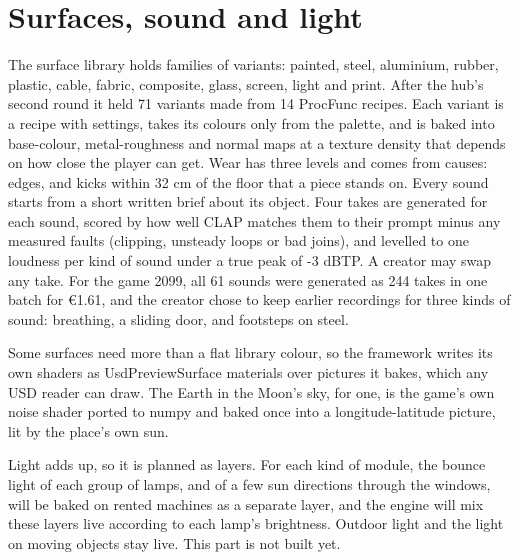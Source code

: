 \section{Surfaces, sound and light}\label{surfaces-sound-and-light}

The surface library holds families of variants: painted, steel, aluminium, rubber, plastic, cable, fabric, composite, glass, screen, light and print. After the hub's second round it held 71 variants made from 14 ProcFunc recipes. Each variant is a recipe with settings, takes its colours only from the palette, and is baked into base-colour, metal-roughness and normal maps at a texture density that depends on how close the player can get. Wear has three levels and comes from causes: edges, and kicks within 32 cm of the floor that a piece stands on. Every sound starts from a short written brief about its object. Four takes are generated for each sound, scored by how well CLAP matches them to their prompt minus any measured faults (clipping, unsteady loops or bad joins), and levelled to one loudness per kind of sound under a true peak of -3 dBTP. A creator may swap any take. For the game 2099, all 61 sounds were generated as 244 takes in one batch for €1.61, and the creator chose to keep earlier recordings for three kinds of sound: breathing, a sliding door, and footsteps on steel.

Some surfaces need more than a flat library colour, so the framework writes its own shaders as UsdPreviewSurface materials over pictures it bakes, which any USD reader can draw. The Earth in the Moon's sky, for one, is the game's own noise shader ported to numpy and baked once into a longitude-latitude picture, lit by the place's own sun.

Light adds up, so it is planned as layers. For each kind of module, the bounce light of each group of lamps, and of a few sun directions through the windows, will be baked on rented machines as a separate layer, and the engine will mix these layers live according to each lamp's brightness. Outdoor light and the light on moving objects stay live. This part is not built yet.
